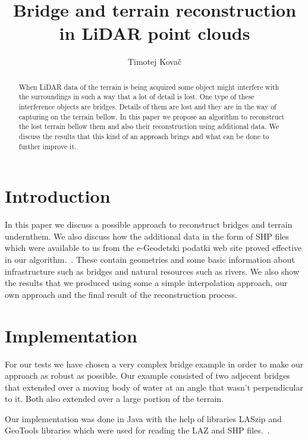 \documentclass{egpubl-eurovis-star}
\title[EG \LaTeX\ Author Guidelines]%
      {Bridge and terrain reconstruction in LiDAR point clouds}
\author[submission ID]{Timotej Kovač}
\begin{document}

\maketitle

\begin{abstract}
When LiDAR data of the terrain is being acquired some object might interfere with the surroundings in such a way that a lot of detail is lost.
One type of these interference objects are bridges.
Details of them are lost and they are in the way of capturing on the terrain bellow.
In this paper we propose an algorithm to reconstruct the lost terrain bellow them and also their reconstruction using additional data.
We discuss the results that this kind of an approach brings and what can be done to further improve it.
\end{abstract}



\section{Introduction}
In this paper we discuss a possible approach to reconstruct bridges and terrain undernthem.
We also discuss how the additional data in the form of SHP files which were available to us from the e-Geodetski podatki web site proved effective in our algorithm.~\cite{shp, egeodetskipodatki}.
These contain geometries and some basic information about infrastructure such as bridges and natural resources such as rivers.
We also show the results that we produced using some a simple interpolation approach, our own approach and the final result of the reconstruction process.

\section{Implementation}
For our tests we have chosen a very complex bridge example in order to make our approach as robust as possible.
Our example consisted of two adjecent bridges that extended over a moving body of water at an angle that wasn't perpendicular to it.
Both also extended over a large portion of the terrain.

Our implementation was done in Java with the help of libraries LASzip and GeoTools libraries which were used for reading the LAZ and SHP files.~\cite{lasreader, geotools}.
\end{document}
